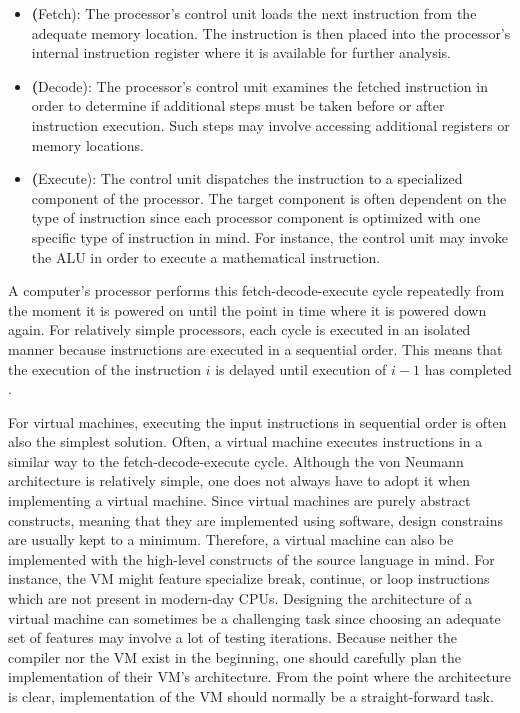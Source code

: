 \begin{itemize}
	\item \textbf(Fetch): The processor's control unit loads the next instruction from the adequate memory location.
	      The instruction is then placed into the processor's internal instruction register where it is available for further analysis.
	\item \textbf(Decode):
	      The processor's control unit examines the fetched instruction in order to determine if additional steps must be taken before or after instruction execution.
	      Such steps may involve accessing additional registers or memory locations.
	\item \textbf(Execute):
	      The control unit dispatches the instruction to a specialized component of the processor.
	      The target component is often dependent on the type of instruction since each processor component is optimized with one specific type of instruction in mind.
	      For instance, the control unit may invoke the ALU in order to execute a mathematical instruction.
\end{itemize}

A computer's processor performs this fetch-decode-execute cycle repeatedly from the moment it is powered on until the point in time where it is powered down again.
For relatively simple processors, each cycle is executed in an isolated manner because instructions are executed in a sequential order.
This means that the execution of the instruction $i$ is delayed until execution of $i - 1$ has completed \cite[pp.~208-209]{Ledin2020-yp}.

For virtual machines, executing the input instructions in sequential order is often also the simplest solution.
Often, a virtual machine executes instructions in a similar way to the fetch-decode-execute cycle.
Although the von Neumann architecture is relatively simple, one does not always have to adopt it when implementing a virtual machine.
Since virtual machines are purely abstract constructs, meaning that they are implemented using software, design constrains are usually kept to a minimum.
Therefore, a virtual machine can also be implemented with the high-level constructs of the source language in mind.
For instance, the VM might feature specialize break, continue, or loop instructions which are not present in modern-day CPUs.
Designing the architecture of a virtual machine can sometimes be a challenging task since choosing an adequate set of features may involve a lot of testing iterations.
Because neither the compiler nor the VM exist in the beginning, one should carefully plan the implementation of their VM's architecture.
From the point where the architecture is clear, implementation of the VM should normally be a straight-forward task.

